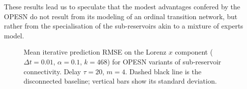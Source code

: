 These results lead us to speculate that the modest advantages confered by the OPESN do not result from its modeling of an ordinal transition network, but rather from the specialisation of the sub-reservoirs akin to a mixture of experts model.

\begin{figure}
    \centering
    \caption{Mean iterative prediction RMSE on the Lorenz $x$ component ($\Delta t=0.01$, $\alpha=0.1$, $k=468$) for OPESN variants of sub-reservoir connectivity. Delay $\tau=20$, $m=4$. Dashed black line is the disconnected baseline; vertical bars show its standard deviation.}
    \label{fig:OPESN_recursive_sub_reservoir_connections_m_3}
\end{figure}



